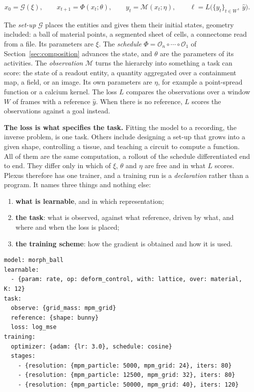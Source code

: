 \documentclass[11pt]{article}
\begin{document}
\[
x_0 = \mathcal G(\xi),
\qquad
x_{t+1} = \Phi(x_t;\theta),
\qquad
y_t = \mathcal M(x_t;\eta),
\qquad
\ell = L\big(\{y_t\}_{t\in W},\ \hat y\big).
\]

The \emph{set-up} $\mathcal G$ places the entities and gives them their initial states,
geometry included: a ball of material points, a segmented sheet of cells, a connectome
read from a file. Its parameters are $\xi$. The \emph{schedule}
$\Phi=\mathcal O_n\circ\cdots\circ\mathcal O_1$ of Section~\ref{sec:composition} advances
the state, and $\theta$ are the parameters of its activities. The \emph{observation}
$\mathcal M$ turns the hierarchy into something a task can score: the state of a readout
entity, a quantity aggregated over a containment map, a field, or an image. Its own
parameters are $\eta$, for example a point-spread function or a calcium kernel. The loss
$L$ compares the observations over a window $W$ of frames with a reference $\hat y$. When
there is no reference, $L$ scores the observations against a goal instead.

\textbf{The loss is what specifies the task.} Fitting the model to a recording, the
inverse problem, is one task. Others include designing a set-up that grows into a given
shape, controlling a tissue, and teaching a circuit to compute a function. All of them are
the same computation, a rollout of the schedule differentiated end to end. They differ only
in which of $\xi$, $\theta$ and $\eta$ are free and in what $L$ scores. Plexus therefore
has one trainer, and a training run is a \emph{declaration} rather than a program. It
names three things and nothing else:

\begin{enumerate}
\item \textbf{what is learnable}, and in which representation;
\item \textbf{the task}: what is observed, against what reference, driven by what, and
where and when the loss is placed;
\item \textbf{the training scheme}: how the gradient is obtained and how it is used.
\end{enumerate}

\begin{lstlisting}[style=yaml]
model: morph_ball
learnable:
  - {param: rate, op: deform_control, with: lattice, over: material, K: 12}
task:
  observe: {grid_mass: mpm_grid}
  reference: {shape: bunny}
  loss: log_mse
training:
  optimizer: {adam: {lr: 3.0}, schedule: cosine}
  stages:
    - {resolution: {mpm_particle: 5000, mpm_grid: 24}, iters: 80}
    - {resolution: {mpm_particle: 12500, mpm_grid: 32}, iters: 80}
    - {resolution: {mpm_particle: 50000, mpm_grid: 40}, iters: 120}
\end{lstlisting}
\end{document}
